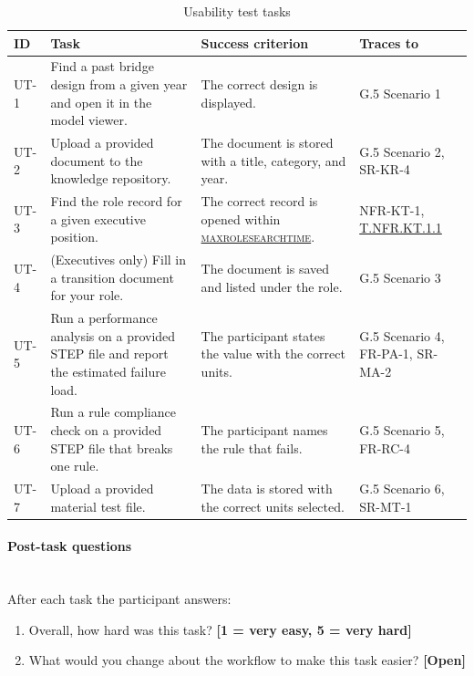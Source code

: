 \documentclass[12pt, titlepage]{article}
\newcommand{\testref}[1]{\hyperlink{test:#1}{#1}}
\DeclareRobustCommand{\cname}[1]{{\renewcommand{\_}{\textunderscore\allowbreak}\textsc{#1}}}
\newcommand{\const}[1]{\hyperlink{const:\detokenize{#1}}{\cname{#1}}}
\newcommand{\utdef}[1]{\leavevmode\hypertarget{ut:#1}{}#1}
\begin{document}
\begin{table}[H]
\centering
\caption{Usability test tasks}
\label{tab:usability-tasks}
\small
\setlength{\tabcolsep}{4pt}
\begin{tabularx}{\textwidth}{>{\raggedright\arraybackslash}p{0.9cm}
  >{\raggedright\arraybackslash}X >{\raggedright\arraybackslash}X
  >{\raggedright\arraybackslash}p{2.1cm}}
\toprule
\textbf{ID} & \textbf{Task} & \textbf{Success criterion} & \textbf{Traces to} \\
\midrule
\utdef{UT-1} & Find a past bridge design from a given year and open it in the model
  viewer. & The correct design is displayed. & G.5 Scenario 1 \\
\utdef{UT-2} & Upload a provided document to the knowledge repository. & The document is
  stored with a title, category, and year. & G.5 Scenario 2, SR-KR-4 \\
\utdef{UT-3} & Find the role record for a given executive position. & The correct record
  is opened within \const{max\_role\_search\_time}. & NFR-KT-1, \testref{T.NFR.KT.1.1} \\
\utdef{UT-4} & (Executives only) Fill in a transition document for your role. & The
  document is saved and listed under the role. & G.5 Scenario 3 \\
\utdef{UT-5} & Run a performance analysis on a provided STEP file and report the
  estimated failure load. & The participant states the value with the correct
  units. & G.5 Scenario 4, FR-PA-1, SR-MA-2 \\
\utdef{UT-6} & Run a rule compliance check on a provided STEP file that breaks one rule.
  & The participant names the rule that fails. & G.5 Scenario 5, FR-RC-4 \\
\utdef{UT-7} & Upload a provided material test file. & The data is stored with the
  correct units selected. & G.5 Scenario 6, SR-MT-1 \\
\bottomrule
\end{tabularx}
\end{table}

\paragraph{Post-task questions}\mbox{}\\
After each task the participant answers:
\begin{enumerate}
  \item Overall, how hard was this task? \textbf{[1 = very easy, 5 = very hard]}
  \item What would you change about the workflow to make this task easier? \textbf{[Open]}
\end{enumerate}
\end{document}
